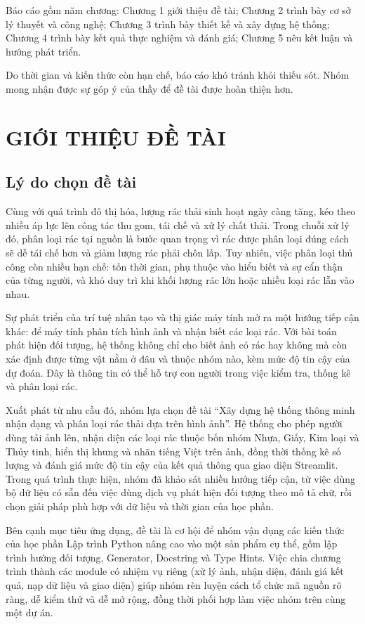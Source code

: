 \documentclass[a4paper,13pt]{extarticle}
\begin{document}
Báo cáo gồm năm chương: Chương 1 giới thiệu đề tài; Chương 2 trình bày cơ sở lý thuyết và công nghệ; Chương 3 trình bày thiết kế và xây dựng hệ thống; Chương 4 trình bày kết quả thực nghiệm và đánh giá; Chương 5 nêu kết luận và hướng phát triển.

Do thời gian và kiến thức còn hạn chế, báo cáo khó tránh khỏi thiếu sót. Nhóm mong nhận được sự góp ý của thầy để đề tài được hoàn thiện hơn.

\newpage
\section{ GIỚI THIỆU ĐỀ TÀI }
\subsection{Lý do chọn đề tài}
Cùng với quá trình đô thị hóa, lượng rác thải sinh hoạt ngày càng tăng, kéo theo nhiều áp lực lên công tác thu gom, tái chế và xử lý chất thải. Trong chuỗi xử lý đó, phân loại rác tại nguồn là bước quan trọng vì rác được phân loại đúng cách sẽ dễ tái chế hơn và giảm lượng rác phải chôn lấp. Tuy nhiên, việc phân loại thủ công còn nhiều hạn chế: tốn thời gian, phụ thuộc vào hiểu biết và sự cẩn thận của từng người, và khó duy trì khi khối lượng rác lớn hoặc nhiều loại rác lẫn vào nhau.

Sự phát triển của trí tuệ nhân tạo và thị giác máy tính mở ra một hướng tiếp cận khác: để máy tính phân tích hình ảnh và nhận biết các loại rác. Với bài toán phát hiện đối tượng, hệ thống không chỉ cho biết ảnh có rác hay không mà còn xác định được từng vật nằm ở đâu và thuộc nhóm nào, kèm mức độ tin cậy của dự đoán. Đây là thông tin có thể hỗ trợ con người trong việc kiểm tra, thống kê và phân loại rác.

Xuất phát từ nhu cầu đó, nhóm lựa chọn đề tài “Xây dựng hệ thống thông minh nhận dạng và phân loại rác thải dựa trên hình ảnh”. Hệ thống cho phép người dùng tải ảnh lên, nhận diện các loại rác thuộc bốn nhóm Nhựa, Giấy, Kim loại và Thủy tinh, hiển thị khung và nhãn tiếng Việt trên ảnh, đồng thời thống kê số lượng và đánh giá mức độ tin cậy của kết quả thông qua giao diện Streamlit. Trong quá trình thực hiện, nhóm đã khảo sát nhiều hướng tiếp cận, từ việc dùng bộ dữ liệu có sẵn đến việc dùng dịch vụ phát hiện đối tượng theo mô tả chữ, rồi chọn giải pháp phù hợp với dữ liệu và thời gian của học phần.

Bên cạnh mục tiêu ứng dụng, đề tài là cơ hội để nhóm vận dụng các kiến thức của học phần Lập trình Python nâng cao vào một sản phẩm cụ thể, gồm lập trình hướng đối tượng, Generator, Docstring và Type Hints. Việc chia chương trình thành các module có nhiệm vụ riêng (xử lý ảnh, nhận diện, đánh giá kết quả, nạp dữ liệu và giao diện) giúp nhóm rèn luyện cách tổ chức mã nguồn rõ ràng, dễ kiểm thử và dễ mở rộng, đồng thời phối hợp làm việc nhóm trên cùng một dự án.
\end{document}
